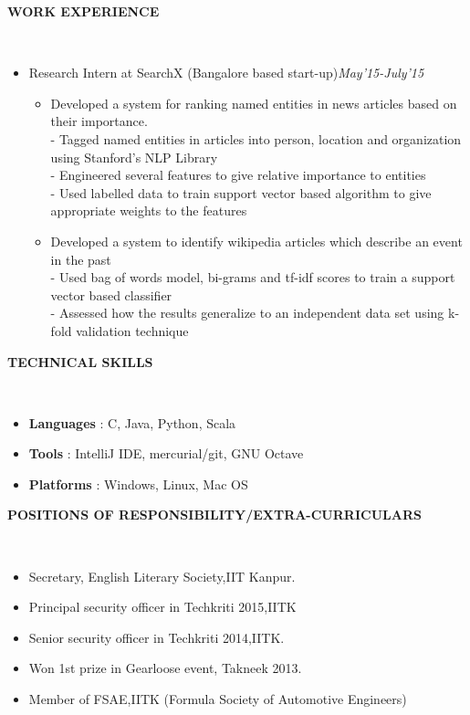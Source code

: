 \documentclass[a4paper,10pt]{article}
\newcommand{\isep}{-2 pt}
\newcommand{\lsep}{-0.5cm}
\newcommand{\resheading}[1]{{\small \colorbox{mygrey}{\begin{minipage}{0.975\textwidth}{\textbf{#1 \vphantom{p\^{E}}}}\end{minipage}}}}
\begin{document}
\resheading{\textbf{WORK EXPERIENCE} }\\[\lsep]
\begin{itemize}
\item\noindent Research Intern at SearchX (Bangalore based start-up)\hfill\emph{May'15-July'15}
\vspace{-2mm}
\begin{itemize}\itemsep \isep
\item \noindent Developed a system for ranking named entities in news articles based on their importance.\\
- Tagged named entities in articles into person, location and organization using Stanford's NLP Library\\
- Engineered several features to give relative importance to entities\\
- Used labelled data to train support vector based algorithm to give appropriate weights to the features\\\vspace{-4mm}
\item \noindent Developed a system to identify wikipedia articles which describe an event in the past\\
- Used bag of words model, bi-grams and tf-idf scores to train a support vector based classifier\\
- Assessed how the results generalize to an independent data set using k-fold validation technique
\end{itemize}
\end{itemize}







\resheading{\textbf{TECHNICAL SKILLS} }\\[\lsep]
\begin{itemize}\itemsep\isep
\item \noindent \textbf{Languages} : C, Java, Python, Scala
\item \noindent \textbf{Tools} : IntelliJ IDE,  mercurial/git, GNU Octave
\item \noindent \textbf{Platforms} : Windows, Linux, Mac OS
\end{itemize}






\resheading{\textbf{POSITIONS OF RESPONSIBILITY/EXTRA-CURRICULARS} }\\[\lsep]
\begin{itemize}\itemsep \isep
\item \noindent Secretary, English Literary Society,IIT Kanpur.
\item \noindent Principal security officer in Techkriti 2015,IITK
\item \noindent Senior security officer in Techkriti 2014,IITK.
\item \noindent Won 1st prize in Gearloose event, Takneek 2013.
\item \noindent Member of FSAE,IITK (Formula Society of Automotive Engineers)
\end{itemize}
\end{document}

